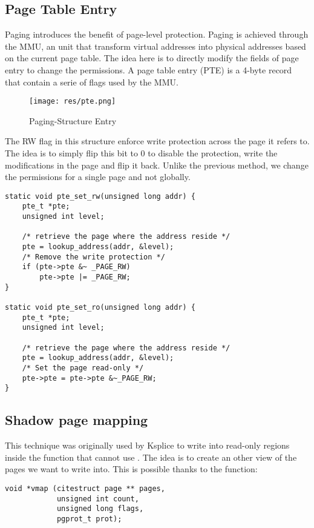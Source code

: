 \subsection{Page Table Entry}
Paging introduces the benefit of page-level protection.
Paging is achieved through the MMU, an unit that transform virtual addresses
into physical addresses based on the current page table.
The idea here is to directly modify the fields of page entry to change the
permissions.
A page table entry (PTE) is a 4-byte record that contain a serie of flags
used by the MMU.\\
\begin{figure}[h]
  \center
  \texttt{[image: res/pte.png]}
  \caption{Paging-Structure Entry}
\end{figure}

The RW flag in this structure enforce write protection across the page it
refers to. The idea is to simply flip this bit to 0 to disable the protection,
write the modifications in the page and flip it back.
Unlike the previous method, we change the permissions for a single page and
not globally.

\begin{lstlisting}[frame=single]
static void pte_set_rw(unsigned long addr) {
    pte_t *pte;
    unsigned int level;

    /* retrieve the page where the address reside */
    pte = lookup_address(addr, &level);
    /* Remove the write protection */
    if (pte->pte &~ _PAGE_RW)
        pte->pte |= _PAGE_RW;
}

static void pte_set_ro(unsigned long addr) {
    pte_t *pte;
    unsigned int level;

    /* retrieve the page where the address reside */
    pte = lookup_address(addr, &level);
    /* Set the page read-only */
    pte->pte = pte->pte &~_PAGE_RW;
}
\end{lstlisting}

\subsection{Shadow page mapping}
This technique was originally used by Ksplice\cite{ksplice} to write into read-only regions
inside the  function that cannot use .
The idea is to create an other view of the pages we want to write into. This
is possible thanks to the  function:
\vspace{-3mm}
\begin{lstlisting}[frame=single]
void *vmap (citestruct page ** pages,
            unsigned int count,
            unsigned long flags,
            pgprot_t prot);
\end{lstlisting}

